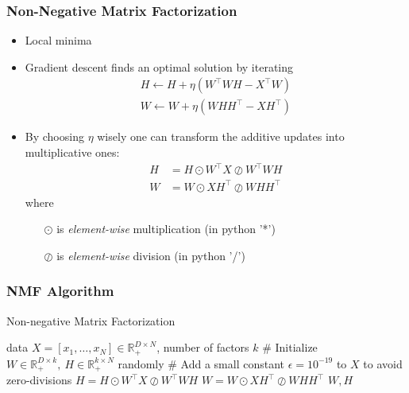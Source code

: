 \documentclass[Nike]{tuberlinbeamer}
\newcommand{\R}{\ensuremath{\mathds{R}}}
\begin{document}
\begin{frame}\frametitle{Non-Negative Matrix Factorization}
\begin{itemize}
\item Local minima  \pause
\item Gradient descent finds an optimal solution by iterating
\begin{align}\nonumber
H \leftarrow H + \eta \left(W^{\top}WH - X^{\top}W\right)\\ \nonumber
W \leftarrow W + \eta \left(WHH^{\top} - XH^{\top}\right) \nonumber
\end{align} \pause
\item By choosing $\eta$ wisely one can transform the additive updates into multiplicative ones:
\begin{align}\nonumber
H &= H \odot W^{\top}X \oslash W^{\top}WH\\ \nonumber
W  & = W \odot XH^{\top} \oslash WHH^{\top}
\end{align}
where
\begin{itemize}
\item[$\odot$] is {\em element-wise} multiplication (in python '*')
\item[$\oslash$] is {\em element-wise} division (in python '/')
\end{itemize}
\end{itemize}
\end{frame}

\begin{frame}[fragile]\frametitle{NMF Algorithm}
\scriptsize
\begin{algorithm}[H]
  \caption{Non-negative Matrix Factorization}
  \begin{algorithmic}[1]
    \REQUIRE data $X=[x_1, \ldots, x_N] \in \R_+^{D\times N}$, number of factors $k$
    \STATE \# Initialize $W \in \R_+^{D\times k},~H \in \R_+^{k\times N}$ randomly
    \STATE \# Add a small constant $\epsilon =10^{-19}$ to $X$ to avoid zero-divisions
     \STATE $H = H \odot W^{\top}X \oslash W^{\top}WH$
     \STATE $W = W \odot XH^{\top} \oslash WHH^{\top}$
     \ENDFOR
\RETURN $W,H$
  \end{algorithmic}
\end{algorithm}
\end{frame}
\end{document}
